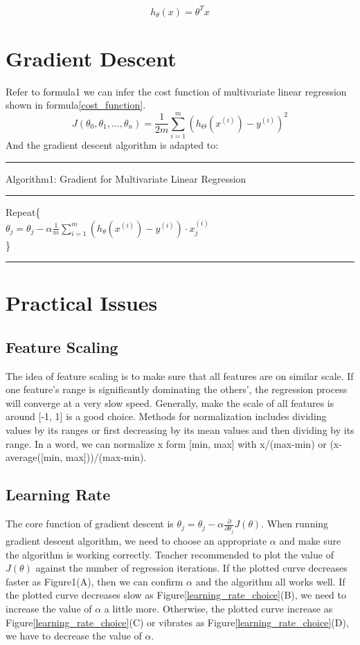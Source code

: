 \documentclass{article}
\begin{document}
\begin{equation}\label{hypothesis_refine}
 h_{\theta}(x) = {\theta}^{T}x
\end{equation}

\section{Gradient Descent}
Refer to formula1 we can infer the cost function of multivariate linear regression shown in formula\ref{cost_function}.
\begin{equation}\label{cost_function}
  J(\theta_{0}, \theta_{1}, \ldots , \theta_{n}) = \frac{1}{2m} \sum_{i=1}^{m} (h_\Theta({x^{(i)}})-y^{(i)})^2
\end{equation}
And the gradient descent algorithm is adapted to:
\medskip
\hrule
\smallskip
Algorithm1: Gradient for Multivariate Linear Regression
\smallskip
\hrule
\smallskip
Repeat\{\\
$\theta_j=\theta_j - \alpha \frac{1}{m} \sum_{i=1}^{m}(h_\theta(x^{(i)})-y^{(i)}) \cdot x^{(i)}_{j}$\\
\}\\
\hrule

\section{Practical Issues}
\subsection{Feature Scaling}
The idea of feature scaling is to make sure that all features are on similar scale. If one feature's range is significantly dominating the others', the regression process will converge at a very slow speed. Generally, make the scale of all features is around [-1, 1] is a good choice. Methods for normalization includes dividing values by its ranges or first decreasing by its mean values and then dividing by its range. In a word, we can normalize x form [min, max] with x/(max-min) or (x-average([min, max]))/(max-min).
\subsection{Learning Rate}
The core function of gradient descent is $\theta_j =\theta_j - \alpha\frac{\partial}{\partial \theta_j}J(\theta)$. When running gradient descent algorithm, we need to choose an appropriate $\alpha$ and make sure the algorithm is working correctly. Teacher recommended to plot the value of $J(\theta)$ against the number of regression iterations. If the plotted curve decreases faster as Figure1(A), then we can confirm $\alpha$ and the algorithm all works well. If the plotted curve decreases slow as Figure\ref{learning_rate_choice}(B), we need to increase the value of $\alpha$ a little more. Otherwise, the plotted curve increase as Figure\ref{learning_rate_choice}(C) or vibrates as Figure\ref{learning_rate_choice}(D), we have to decrease the value of $\alpha$.
\end{document}
